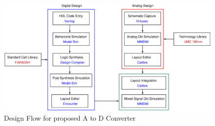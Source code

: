 \begin{figure}[ht]
	\begin{center}
		\includegraphics[scale=0.45]{./Figures/MixedSignalDesignFlow.ps}
		\caption{Design Flow for proposed A to D Converter}
		\label{fig:MDF}
	\end{center}
\end{figure}











